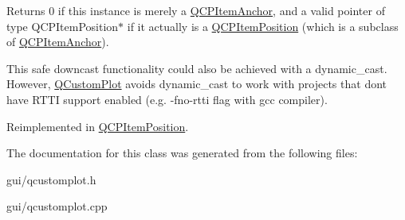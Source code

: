 Returns 0 if this instance is merely a \hyperlink{classQCPItemAnchor}{Q\+C\+P\+Item\+Anchor}, and a valid pointer of type Q\+C\+P\+Item\+Position$\ast$ if it actually is a \hyperlink{classQCPItemPosition}{Q\+C\+P\+Item\+Position} (which is a subclass of \hyperlink{classQCPItemAnchor}{Q\+C\+P\+Item\+Anchor}).

This safe downcast functionality could also be achieved with a dynamic\+\_\+cast. However, \hyperlink{classQCustomPlot}{Q\+Custom\+Plot} avoids dynamic\+\_\+cast to work with projects that don\textquotesingle{}t have R\+T\+TI support enabled (e.\+g. -\/fno-\/rtti flag with gcc compiler). 

Reimplemented in \hyperlink{classQCPItemPosition_a008ff9ebe645a963671b68bcf7f7a1c0}{Q\+C\+P\+Item\+Position}.



The documentation for this class was generated from the following files\+:\begin{DoxyCompactItemize}
\item 
gui/qcustomplot.\+h\item 
gui/qcustomplot.\+cpp\end{DoxyCompactItemize}
